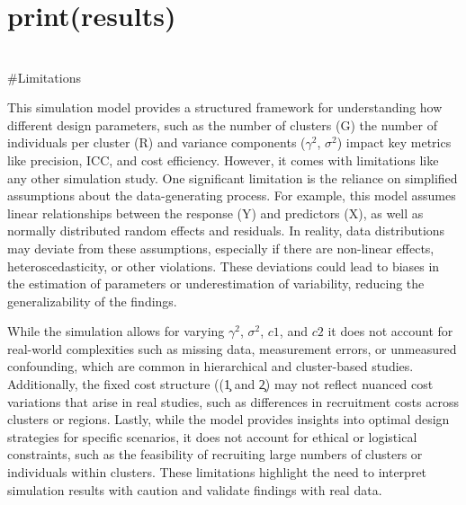 \documentclass[
]{article}
\begin{document}
\hypertarget{printresults}{%
\section{print(results)}\label{printresults}}

\hypertarget{section-31}{%
\section{}\label{section-31}}

\hypertarget{section-32}{%
\section{}\label{section-32}}

\hypertarget{section-33}{%
\section{}\label{section-33}}

\hypertarget{section-34}{%
\section{}\label{section-34}}

\#Limitations

This simulation model provides a structured framework for understanding
how different design parameters, such as the number of clusters (G) the
number of individuals per cluster (R) and variance components
(\(\gamma^2\), \(\sigma^2\)) impact key metrics like precision, ICC, and
cost efficiency. However, it comes with limitations like any other
simulation study. One significant limitation is the reliance on
simplified assumptions about the data-generating process. For example,
this model assumes linear relationships between the response (Y) and
predictors (X), as well as normally distributed random effects and
residuals. In reality, data distributions may deviate from these
assumptions, especially if there are non-linear effects,
heteroscedasticity, or other violations. These deviations could lead to
biases in the estimation of parameters or underestimation of
variability, reducing the generalizability of the findings.

While the simulation allows for varying \(\gamma^2\), \(\sigma^2\),
\(c1\), and \(c2\) it does not account for real-world complexities such
as missing data, measurement errors, or unmeasured confounding, which
are common in hierarchical and cluster-based studies. Additionally, the
fixed cost structure ((\c1 and \c2) may not reflect nuanced cost
variations that arise in real studies, such as differences in
recruitment costs across clusters or regions. Lastly, while the model
provides insights into optimal design strategies for specific scenarios,
it does not account for ethical or logistical constraints, such as the
feasibility of recruiting large numbers of clusters or individuals
within clusters. These limitations highlight the need to interpret
simulation results with caution and validate findings with real data.
\end{document}

